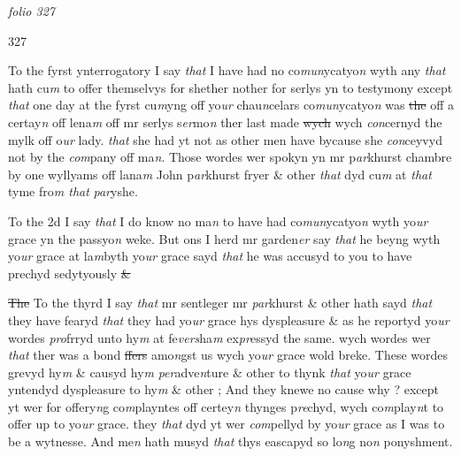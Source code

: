 \documentclass[12pt, a4paper]{book}
\begin{document}
\textit{folio 327}



\begin{flushright}{\color{Mahogany}327}\end{flushright}

				\marginpar[\vspace{0.5cm}{\textcolor{Gray}{1}}]{}
			
		\ifthenelse{\isodd{\thepage}}
		{\reversemarginpar}
		{\normalmarginpar}
		To the fyrst ynterrogatory I say \textit{that} I have had no co\textit{mun}ycatyo\textit{n} wyth any \textit{that} hath cu\textit{m} to
offer themselvys for shether nother for serlys yn to testymony except \textit{that} one day at
the fyrst cu\textit{m}yng off yo\textit{ur} chau\textit{n}celars co\textit{mun}ycatyo\textit{n} was \sout{the }off a certay\textit{n} off lena\textit{m} off mr serlys
s\textit{er}mo\textit{n} ther last made \sout{wych} wych \textit{con}cernyd the mylk off o\textit{ur} lady. \textit{that} she had yt not
as other men have bycause she \textit{con}ceyvyd not by the \textit{com}pany off ma\textit{n}. Those wordes
wer spokyn yn mr p\textit{ar}khurst chambre by one wyllyams off lana\textit{m} John p\textit{ar}khurst fryer \& 
other \textit{that} dyd cu\textit{m} at \textit{that} tyme fro\textit{m that}
               \textit{par}yshe.


				\marginpar[\vspace{0.5cm}{\textcolor{Gray}{2}}]{}
			
	
		\ifthenelse{\isodd{\thepage}}
		{\reversemarginpar}
		{\normalmarginpar}
		To the 2d I say \textit{that} I do know no ma\textit{n} to have had co\textit{mun}ycatyo\textit{n} wyth yo\textit{ur} grace yn the passyo\textit{n} 
weke. But ons I herd mr garden\textit{er} say \textit{that} he beyng wyth yo\textit{ur} grace at la\textit{m}byth yo\textit{ur} grace
sayd \textit{that} he was accusyd to you to have prechyd sedytyously \sout{\& }


				\marginpar[\vspace{0.5cm}{\textcolor{Gray}{3}}]{}
			 
		\ifthenelse{\isodd{\thepage}}
		{\reversemarginpar}
		{\normalmarginpar}
		\sout{The }To the thyrd I say \textit{that} mr sentleger mr \textit{par}khurst \& other hath sayd \textit{that} they have fearyd
\textit{that} they had yo\textit{ur} grace hys dyspleasure \& as he reportyd yo\textit{ur} wordes \textit{pro}frryd unto hy\textit{m}
at fe\textit{vers}ha\textit{m} ex\textit{pr}essyd the same. wych wordes wer \textit{that} ther was a bond \sout{ffers} amo\textit{n}gst us
wych yo\textit{ur} grace wold breke. These wordes grevyd hy\textit{m} \& causyd hy\textit{m}
               \textit{per}adve\textit{n}ture
\& other to thynk \textit{that} yo\textit{ur} grace yntendyd dyspleasure to hy\textit{m} \& other ; And they knewe 
no cause why ? except yt wer for offery\textit{n}g co\textit{m}playntes off certey\textit{n} thynges p\textit{re}chyd, wych
co\textit{m}play\textit{n}t to offer up to yo\textit{ur} grace. they \textit{that} dyd yt wer \textit{com}pellyd by yo\textit{ur} grace as I was
to be a wytnesse. And me\textit{n} hath musyd \textit{that} thys eascapyd so lo\textit{n}g no\textit{n} ponyshment.
\end{document}
